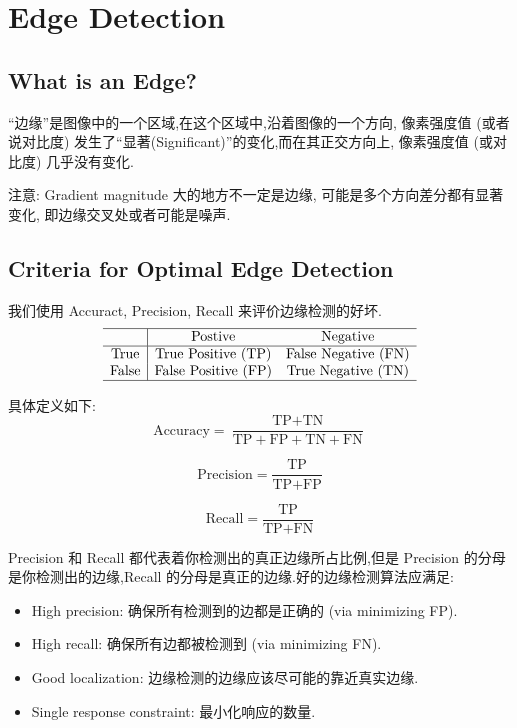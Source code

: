 \section{Edge Detection}

\subsection{What is an Edge?}
“边缘”是图像中的一个区域,在这个区域中,沿着图像的一个方向,
像素强度值 (或者说对比度) 发生了“显著(Significant)”的变化,而在其正交方向上,
像素强度值 (或对比度) 几乎没有变化.

注意: Gradient magnitude 大的地方不一定是边缘, 可能是多个方向差分都有显著变化, 即边缘交叉处或者可能是噪声.

\subsection{Criteria for Optimal Edge Detection}
我们使用 Accuract, Precision, Recall 来评价边缘检测的好坏.
\[
\begin{array}{c|cc}
    \hline
     & \text{Postive} & \text{Negative} \\
    \hline
    \text{True} & \text{True Positive (TP)} & \text{False Negative (FN)} \\
    \text{False} & \text{False Positive (FP)} & \text{True Negative (TN)} \\
    \hline
\end{array}
\]

具体定义如下:
\begin{equation}
\text{Accuracy}=\frac{\text{TP}+\text{TN}}{\text{TP}+\text{FP}+\text{TN}+\text{FN}} 
\end{equation}

\begin{equation}
\text{Precision}=\frac{\text{TP}}{\text{TP}+\text{FP}} 
\end{equation}

\begin{equation}
\text{Recall}=\frac{\text{TP}}{\text{TP}+\text{FN}}
\end{equation}

Precision 和 Recall 都代表着你检测出的真正边缘所占比例,但是 Precision 的分母
是你检测出的边缘,Recall 的分母是真正的边缘.好的边缘检测算法应满足:
\begin{itemize}
    \item High precision: 确保所有检测到的边都是正确的 (via minimizing FP).
    \item High recall: 确保所有边都被检测到 (via minimizing FN).
    \item Good localization: 边缘检测的边缘应该尽可能的靠近真实边缘.
    \item Single response constraint: 最小化响应的数量.
\end{itemize}

